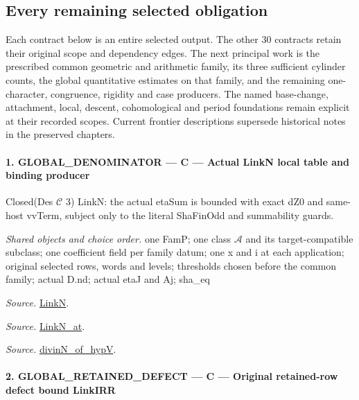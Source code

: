 \documentclass[11pt,a4paper]{article}
\numberwithin{equation}{section}
\theoremstyle{remark}\newtheorem{remark}[theorem]{Remark}
\begin{document}
\subsection{Every remaining selected obligation}

Each contract below is an entire selected output.  The other 30
contracts retain their original scope and dependency edges.
The next principal work is the prescribed common geometric and
arithmetic family, its three sufficient cylinder counts, the
global quantitative estimates on that family, and the remaining
one-character, congruence, rigidity and case producers.  The named
base-change, attachment, local, descent, cohomological and period
foundations remain explicit at their recorded scopes.  Current
frontier descriptions supersede historical notes in the preserved
chapters.
\paragraph{1. GLOBAL\_\allowbreak DENOMINATOR — C — Actual LinkN local table and binding producer}

Closed(Des $\mathcal C$ 3) LinkN: the actual etaSum is bounded with exact dZ0 and same-host vvTerm, subject only to the literal ShaFinOdd and summability guards.

\emph{Shared objects and choice order.} one FamP; one class $\mathcal A$ and its target-compatible subclass; one coefficient field per family datum; one x and i at each application; original selected rows, words and levels; thresholds chosen before the common family; actual D.nd; actual etaJ and Aj; sha\_\allowbreak eq

\emph{Source.} \href{https://github.com/CocoSgt/riemann-hypothesis-lean/blob/7cbf7a0c32fca1badf05931879a37c3f8a2b03b4/src/Formalism/SharpRestriction/GlobalTheoremInputs.lean#L45-L48}{LinkN}.

\emph{Source.} \href{https://github.com/CocoSgt/riemann-hypothesis-lean/blob/7cbf7a0c32fca1badf05931879a37c3f8a2b03b4/src/Formalism/SharpRestriction/GlobalTheoremInputs.lean#L40-L44}{LinkN\_\allowbreak at}.

\emph{Source.} \href{https://github.com/CocoSgt/riemann-hypothesis-lean/blob/7cbf7a0c32fca1badf05931879a37c3f8a2b03b4/src/Development/AutomorphicArithmetic/CharacterBoxes/DivinNOfHypV.lean#L117-L134}{divinN\_\allowbreak of\_\allowbreak hypV}.



\paragraph{2. GLOBAL\_\allowbreak RETAINED\_\allowbreak DEFECT — C — Original retained-row defect bound LinkIRR}
\end{document}
